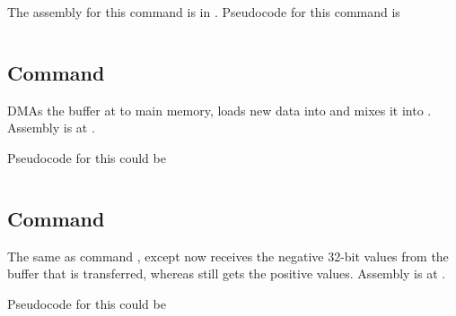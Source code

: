 The assembly for this command is in . Pseudocode for this command is 

\inputminted{c}{../ucode/command_f.c}

\subsection{Command }

DMAs the buffer at  to main memory, loads new data into  and mixes it into . Assembly is at .

Pseudocode for this could be 

\inputminted{c}{../ucode/command_10.c}

\subsection{Command }

The same as command , except now  receives the negative 32-bit values from the buffer that is transferred, whereas  still gets the positive values. Assembly is at .

Pseudocode for this could be 

\inputminted{c}{../ucode/command_11.c}